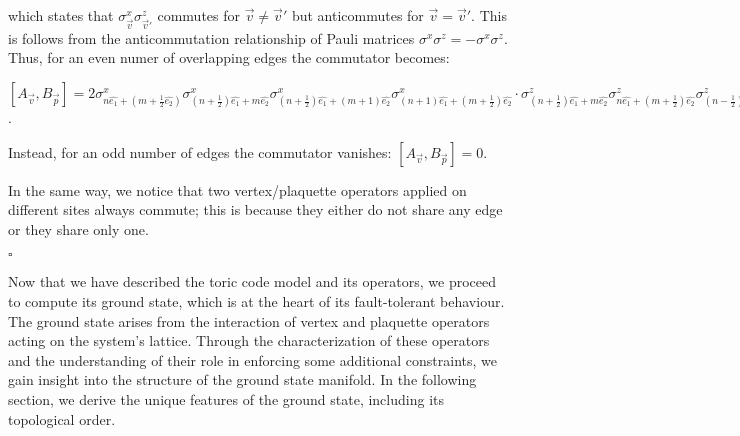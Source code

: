 \documentclass{Configuration_Files/PoliMi3i_thesis}
\begin{document}
which states that 	$\sigma^x_{\vec{v}}\sigma^z_{\vec{v}'}$ commutes for $\vec{v} \neq \vec{v}'$   but anticommutes for $\vec{v} = \vec{v}'$. This is follows from the anticommutation relationship of Pauli matrices $\sigma^x \sigma^z = - \sigma^x \sigma^z$. Thus, for an even numer of overlapping edges the commutator becomes:\newline

\begin{center}
	
	$[A_{\vec{v}},B_{\vec{p}}] = 2
	\sigma^x_{n\hat{e_1} + (m+\frac{1}{2}\hat{e_2})} \sigma^x_{(n+ \frac{1}{2})\hat{e_1} + m\hat{e_2}} \sigma^x_{(n+ \frac{1}{2})\hat{e_1} + (m + 1)\hat{e_2}} \sigma^x_{(n+ 1)\hat{e_1} + (m + \frac{1}{2})\hat{e_2}} \cdot
	\sigma^z_{(n+\frac{1}{2})\hat{e_1} + m\hat{e_2}} \sigma^z_{n\hat{e_1}+(m+\frac{1}{2})\hat{e_2}} \sigma^z_{(n-\frac{1}{2})\hat{e_1} + m\hat{e_2}} \sigma^z_{n\hat{e_1}+(m-\frac{1}{2})\hat{e_2}} $. \newline

\end{center}
Instead, for an odd number of edges the commutator vanishes: $[A_{\vec{v}},B_{\vec{p}}]=0$.

In the same way, we notice that two vertex/plaquette operators applied on different sites always commute; this is because they either do not share any edge or they share only one.\newline


\hfill $\square$

Now that we have described the toric code model and its operators, we proceed to compute its ground state, which is at the heart of its fault-tolerant behaviour. The ground state arises from the interaction of vertex and plaquette operators acting on the system's lattice. Through the characterization of these operators and the understanding of their role in enforcing some additional constraints, we gain insight into the structure of the ground state manifold. \newline
In the following section, we derive the unique features of the ground state, including its topological order. \newline 

\end{document}
